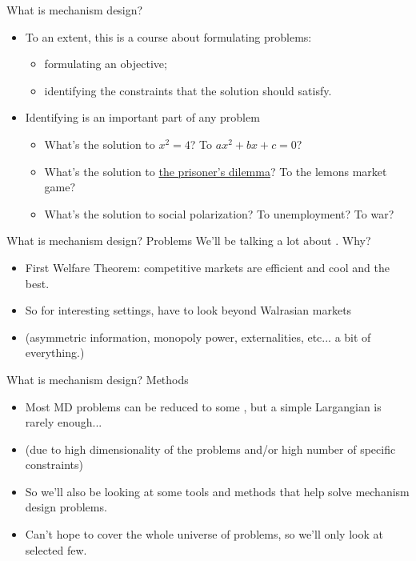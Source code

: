\documentclass[english,10pt
,aspectratio=169
]{beamer}
\begin{document}
\begin{frame}{What is mechanism design?}
	\begin{itemize}
		\item To an extent, this is a course about \alert{formulating problems}:
		\begin{itemize}
			\item formulating an objective;
			\item \alert{identifying the constraints} that the solution should satisfy.
		\end{itemize}
		
		\pause\bigskip 
		\item Identifying  is an important part of any problem
		\begin{itemize}
			\item What's the solution to $x^2 = 4$? To $a x^2 + bx + c = 0$?
			\pause 
			\item What's the solution to \href{https://www.smbc-comics.com/comic/dilemma-2}{the prisoner's dilemma}? To the lemons market game?
			\pause 
			\item What's the solution to social polarization? To unemployment? To war?
		\end{itemize}
	\end{itemize}
\end{frame}


\begin{frame}{What is mechanism design? Problems}
	We'll be talking a lot about . Why?
	\begin{itemize}
		\item First Welfare Theorem: competitive markets are efficient and cool and the best.
		\item So for interesting settings, have to look beyond Walrasian markets
		\item (asymmetric information, monopoly power, externalities, etc... a bit of everything.)
	\end{itemize}
\end{frame}


\begin{frame}{What is mechanism design? Methods}
	\begin{itemize}
		\item Most MD problems can be reduced to some , but a simple Largangian is rarely enough...
		\item (due to high dimensionality of the problems and/or high number of specific constraints)
		\item So we'll also be looking at some \alert{tools and methods} that help solve mechanism design problems.
		\item Can't hope to cover the whole universe of problems, so we'll only look at selected few.
	\end{itemize}
\end{frame}
\end{document}
